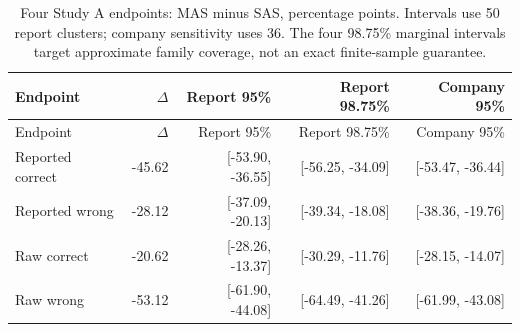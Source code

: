 {\small\setlength{\tabcolsep}{3pt}\begin{longtable}{lrrrr}
\caption{Four Study A endpoints: MAS minus SAS, percentage points. Intervals use 50 report clusters; company sensitivity uses 36. The four 98.75\% marginal intervals target approximate family coverage, not an exact finite-sample guarantee.}\label{tab:primary-ci}\\
Endpoint & $\Delta$ & Report 95\% & Report 98.75\% & Company 95\%\\\toprule\endfirsthead
Endpoint & $\Delta$ & Report 95\% & Report 98.75\% & Company 95\%\\\toprule\endhead
Reported correct & -45.62 & [-53.90, -36.55] & [-56.25, -34.09] & [-53.47, -36.44]\\
Reported wrong & -28.12 & [-37.09, -20.13] & [-39.34, -18.08] & [-38.36, -19.76]\\
Raw correct & -20.62 & [-28.26, -13.37] & [-30.29, -11.76] & [-28.15, -14.07]\\
Raw wrong & -53.12 & [-61.90, -44.08] & [-64.49, -41.26] & [-61.99, -43.08]\\
\bottomrule\end{longtable}}